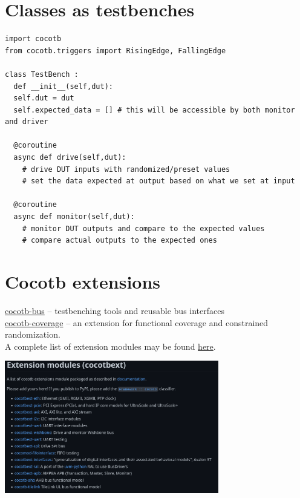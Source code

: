 \documentclass[aspectratio=169]{beamer}
\begin{document}
\section*{Classes as testbenches}
\begin{frame}[fragile]{\secname}

  \begin{verbatim}
import cocotb
from cocotb.triggers import RisingEdge, FallingEdge

class TestBench : 
  def __init__(self,dut):
  self.dut = dut
  self.expected_data = [] # this will be accessible by both monitor and driver

  @coroutine
  async def drive(self,dut):
    # drive DUT inputs with randomized/preset values
    # set the data expected at output based on what we set at input
  
  @coroutine
  async def monitor(self,dut):
    # monitor DUT outputs and compare to the expected values
    # compare actual outputs to the expected ones

    \end{verbatim}
    
\end{frame}

\section*{Cocotb extensions}
\begin{frame}{\secname}
  \href{https://github.com/cocotb/cocotb-bus}{\color{blue}cocotb-bus} -- 
  testbenching tools and reusable bus interfaces\\
  \href{https://github.com/mciepluc/cocotb-coverage}{\color{blue}cocotb-coverage} -- 
  an extension for functional coverage and constrained randomization.\\
  A complete list of extension modules may be found 
\href{https://github.com/cocotb/cocotb/wiki/Further-Resources\#extension-modules-cocotbext}{\color{blue}here}.

    \centering
    \includegraphics[width=0.7\textwidth]{figs/cocotb_ext_github.png}
    
\end{frame}
\end{document}
